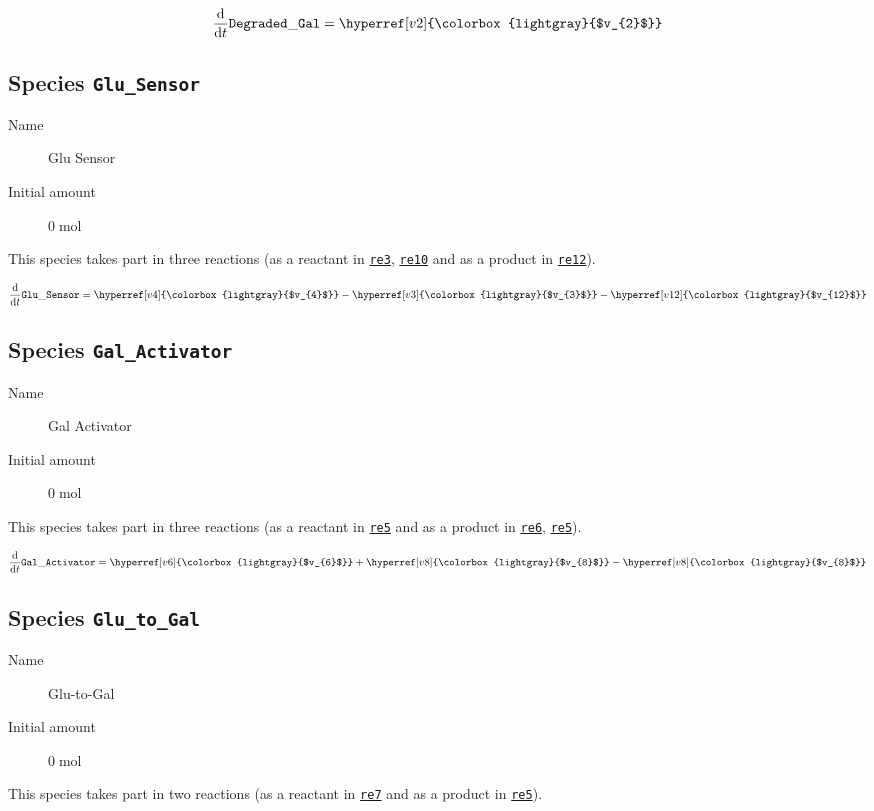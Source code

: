 \documentclass[11pt,twoside,bibtotoc,a4paper]{scrartcl}
\begin{document}
\begin{dmath}
\frac{\mathrm d}{\mathrm dt} \mathtt{Degraded\-\_Gal} = \hyperref[v2]{\colorbox{lightgray}{$v_{2}$}}
\end{dmath}

\subsection{Species \texttt{Glu\-\_Sensor}}
\begin{description}
\item[Name] Glu Sensor
\item[Initial amount] $0\;\mathrm{mol}$
\end{description}
This species takes part in three reactions (as a reactant in  \hyperref[v3]{\texttt{re3}}, \hyperref[v12]{\texttt{re10}} and as a product in  \hyperref[v4]{\texttt{re12}}).

\begin{dmath}
\frac{\mathrm d}{\mathrm dt} \mathtt{Glu\-\_Sensor} = \hyperref[v4]{\colorbox{lightgray}{$v_{4}$}}-\hyperref[v3]{\colorbox{lightgray}{$v_{3}$}}-\hyperref[v12]{\colorbox{lightgray}{$v_{12}$}}
\end{dmath}

\subsection{Species \texttt{Gal\-\_Activator}}
\begin{description}
\item[Name] Gal Activator
\item[Initial amount] $0\;\mathrm{mol}$
\end{description}
This species takes part in three reactions (as a reactant in  \hyperref[v8]{\texttt{re5}} and as a product in  \hyperref[v6]{\texttt{re6}}, \hyperref[v8]{\texttt{re5}}).

\begin{dmath}
\frac{\mathrm d}{\mathrm dt} \mathtt{Gal\-\_Activator} = \hyperref[v6]{\colorbox{lightgray}{$v_{6}$}} + \hyperref[v8]{\colorbox{lightgray}{$v_{8}$}}-\hyperref[v8]{\colorbox{lightgray}{$v_{8}$}}
\end{dmath}

\subsection{Species \texttt{Glu\-\_to\-\_Gal}}
\begin{description}
\item[Name] Glu-to-Gal
\item[Initial amount] $0\;\mathrm{mol}$
\end{description}
This species takes part in two reactions (as a reactant in  \hyperref[v9]{\texttt{re7}} and as a product in  \hyperref[v8]{\texttt{re5}}).
\end{document}
